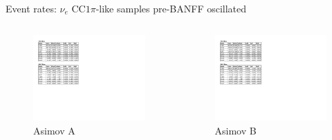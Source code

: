\documentclass{beamer}
\begin{document}
\begin{frame}{Event rates: $\nu_e\text{ CC}1\pi$-like samples pre-BANFF oscillated}
	\centering

	\begin{columns}
		\begin{column}{0.5\paperwidth}
			\begin{figure}
				\includegraphics[page=3, trim={0cm 15cm 13cm 1cm}, clip, scale=0.52] {images/rates/prefit_A}
				\caption*{Asimov A}
			\end{figure}
		\end{column}
		\begin{column}{0.5\paperwidth}
			\begin{figure}
				\includegraphics[page=3, trim={0cm 15cm 13cm 1cm}, clip, scale=0.52] {images/rates/prefit_B}
				\caption*{Asimov B}
			\end{figure}
		\end{column}
	\end{columns}
\end{frame}
\end{document}
